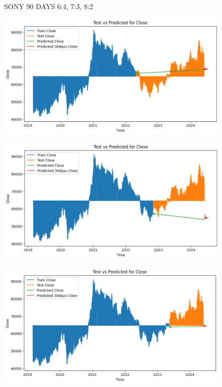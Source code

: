 \documentclass{article}
\begin{document}
\begin{multicols}{2}
\begin{figure}[H]
\begin{minipage}{0.15\textwidth}
    \label{fig:3}
    \end{minipage}
    \caption{SONY 90 DAYS  6:4, 7:3, 8:2 }
\end{figure}

\begin{figure}[H]
    \centering
    \begin{minipage}{0.15\textwidth}
    \centering
    \includegraphics[width=1\textwidth]{Image/VARMA/SAMSUNG/6_4/30.png}
   
    \label{fig:1}
    \end{minipage}%
    \begin{minipage}{0.15\textwidth}
    \centering
    \includegraphics[width=1\textwidth]{Image/VARMA/SAMSUNG/7_3/30.png}
  
    \label{fig:2}
    \end{minipage}%
    \begin{minipage}{0.15\textwidth}
    \centering
    \includegraphics[width=1\textwidth]{Image/VARMA/SAMSUNG/8_2/30.png}


\end{minipage}
\end{figure}
\end{multicols}
\end{document}
